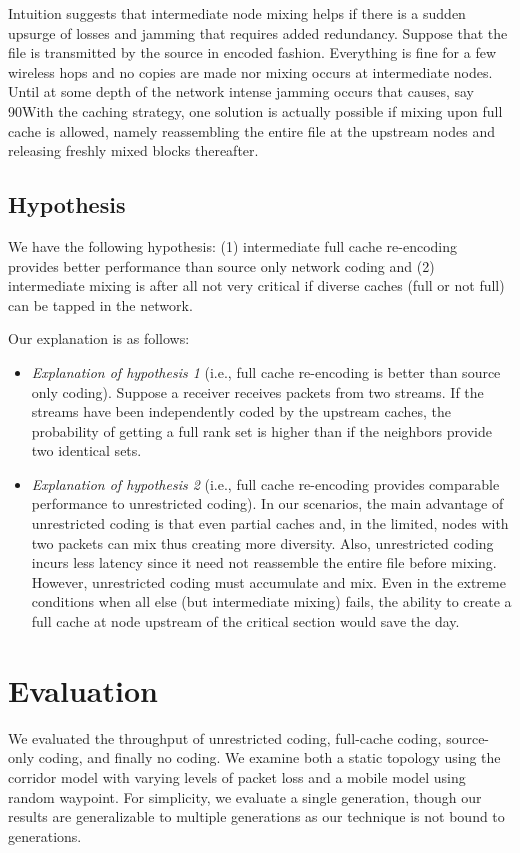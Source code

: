 Intuition suggests that intermediate node mixing helps if there is a sudden upsurge of losses and jamming that requires added redundancy. Suppose that the file is transmitted by the source in encoded fashion. Everything is fine for a few wireless hops and no copies are made nor mixing occurs at intermediate nodes. Until at some depth of the network intense jamming occurs that causes, say 90With the caching strategy, one solution is actually possible if mixing upon full cache is allowed, namely reassembling the entire file at the upstream nodes and releasing freshly mixed blocks thereafter.  

\subsection{Hypothesis}

We have the following hypothesis: (1) intermediate full cache re-encoding provides better performance than source only network coding and (2) intermediate mixing is after all not very critical if diverse caches (full or not full) can be tapped in the network.

Our explanation is as follows:

\begin{itemize}

\item \emph{Explanation of hypothesis 1} (i.e.,  full cache re-encoding is better than source only coding). Suppose a receiver receives packets from two streams. If the streams have been independently coded by the upstream caches, the probability of getting a full rank set is higher than if the neighbors provide two identical sets.

\item \emph{Explanation of hypothesis 2} (i.e., full cache re-encoding provides comparable performance to unrestricted coding). In our scenarios, the main advantage of unrestricted coding is that even partial caches and, in the limited, nodes with two packets can mix thus creating more diversity. Also, unrestricted coding incurs less latency since it need not reassemble the entire file before mixing. However, unrestricted coding must accumulate and mix. Even in the extreme conditions when all else (but intermediate mixing) fails, the ability to create a full cache at node upstream of the critical section would save the day.
\end{itemize}

\section{Evaluation}
We evaluated the throughput of unrestricted coding, full-cache coding, source-only coding, and finally no coding. We examine both a static topology using the corridor model \cite{Oh:2009:RMR:1702135.1702167} with varying levels of packet loss and a mobile model using random waypoint. For simplicity, we evaluate a single generation, though our results are generalizable to multiple generations as our technique is not bound to generations.


